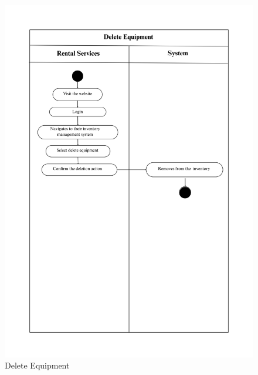 \begin{figure}[h]
    \centering
    \includegraphics[width=1\textwidth]{Images/Activity Diagrams/22 Delete Equipment.png}
    \caption{Delete Equipment}
    \label{fig:activity-delete-equ}
\end{figure}

